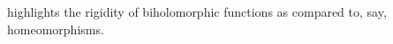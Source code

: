 \documentclass{homework}
\begin{document}
\begin{problem}
                                                                                                                                                                                                                                                                                                                                                                                      highlights the rigidity of biholomorphic functions as compared to,
                                                                                                                                                                                                                                                                                                                                                                                        say, homeomorphisms.
                                                                                                                                                                                                                                                                                                                                                                                        \end{problem}
\end{document}
